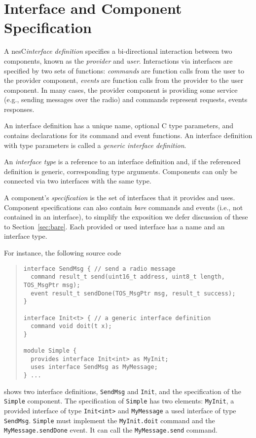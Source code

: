 \documentclass[11pt,letterpaper]{article}
\newcommand{\code}[1]{{\tt #1}}
\newcommand{\nesc}{nesC\xspace}
\begin{document}
\section{Interface and Component Specification}
\label{sec:interface}

A \nesc \emph{interface definition} specifies a bi-directional interaction
between two components, known as the \emph{provider} and
\emph{user}. Interactions via interfaces are specified by two sets of
functions: \emph{commands} are function calls from the user to the provider
component, \emph{events} are function calls from the provider to the user
component. In many cases, the provider component is providing some service
(e.g., sending messages over the radio) and commands represent requests,
events responses.

An interface definition has a unique name, optional C type parameters, and
contains declarations for its command and event functions. An interface
definition with type parameters is called a \emph{generic interface
definition}.

An \emph{interface type} is a reference to an interface definition and, if
the referenced definition is generic, corresponding type
arguments. Components can only be connected via two interfaces with the
same type.

A component's \emph{specification} is the set of interfaces that it
provides and uses. Component specifications can also contain \emph{bare}
commands and events (i.e., not contained in an interface), to simplify the
exposition we defer discussion of these to Section~\ref{sec:bare}. Each
provided or used interface has a name and an interface type.

For instance, the following source code
\begin{quote} \begin{verbatim}
interface SendMsg { // send a radio message
  command result_t send(uint16_t address, uint8_t length, TOS_MsgPtr msg);
  event result_t sendDone(TOS_MsgPtr msg, result_t success);
}

interface Init<t> { // a generic interface definition
  command void doit(t x);
}

module Simple {
  provides interface Init<int> as MyInit;
  uses interface SendMsg as MyMessage;
} ...
\end{verbatim} \end{quote}
shows two interface definitions, \code{SendMsg} and \code{Init}, and the
specification of the \code{Simple} component. The specification of
\code{Simple} has two elements: \code{MyInit}, a provided interface of type
\code{Init<int>} and \code{MyMessage} a used interface of type
\code{SendMsg}. \code{Simple} must implement the \code{MyInit.doit} command
and the \code{MyMessage.sendDone} event. It can call the
\code{MyMessage.send} command.
\end{document}
